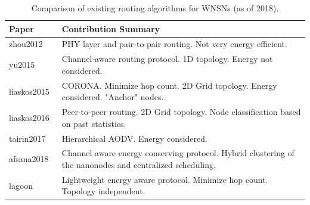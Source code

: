 \documentclass[12pt, oneandhalf, chaparabic, sees, ms]{metu}
\begin{document}
\vspace{-0.5cm}
\renewcommand{\arraystretch}{1.2}%
\begin{table}[H]
\begin{center}
\caption{Comparison of existing routing algorithms for WNSNs (as of 2018).}
\label{tab:litsur}
\begin{adjustbox}{max width=\textwidth}
\begin{tabular}{| l || l |} 
\hline
\rowcolor{lightgray}
\textbf{Paper} & \textbf{Contribution Summary} \tabularnewline
\hline \hline
 \cellcolor{lightgray} zhou2012~\cite{zhou2012}       &  {\parbox[t]{14cm}{PHY layer and pair-to-pair routing. Not very energy efficient.}} \tabularnewline \hline
 \cellcolor{lightgray} yu2015~\cite{yu2015}           &  {\parbox[t]{14cm}{Channel-aware routing protocol. 1D topology. Energy not considered.}} \tabularnewline \hline
 \cellcolor{lightgray} liaskos2015~\cite{liaskos2015} &  {\parbox[t]{14cm}{CORONA. Minimize hop count. 2D Grid topology. Energy considered. "Anchor" nodes.}}\tabularnewline \hline
 \cellcolor{lightgray} liaskos2016~\cite{liaskos2016} &  {\parbox[t]{14cm}{Peer-to-peer routing.  2D Grid topology. Node classification based on past statistics.}} \tabularnewline \hline
 \cellcolor{lightgray} tairin2017~\cite{tairin2017}   &  {\parbox[t]{14cm}{Hierarchical AODV. Energy considered.}} \tabularnewline \hline
 \cellcolor{lightgray} afsana2018~\cite{afsana2018}   &  {\parbox[t]{14cm}{Channel aware energy conserving protocol. Hybrid clustering of the nanonodes and centralized scheduling.}} \tabularnewline \hline\hline
 \rowcolor{green}
 lagoon       &  {\parbox[t]{12cm}{Lightweight energy aware protocol. Minimize hop count. Topology independent.}} \tabularnewline \hline
\end{tabular}          
\end{adjustbox}        
\end{center}           
\end{table}            
\renewcommand{\arraystretch}{1}%
\end{document}
